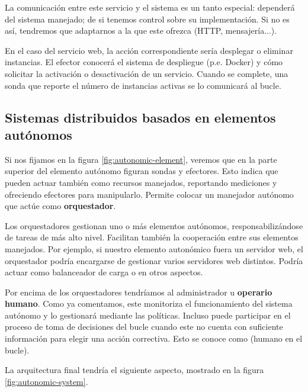 La comunicación entre este servicio y el sistema es un tanto especial: dependerá del sistema manejado; de si tenemos control sobre su implementación. Si no es así, tendremos que adaptarnos a la que este ofrezca (HTTP, mensajería...).

En el caso del servicio web, la acción correspondiente sería desplegar o eliminar instancias. El efector conocerá el sistema de despliegue (p.e. Docker) y cómo solicitar la activación o desactivación de un servicio. Cuando se complete, una sonda que reporte el número de instancias activas se lo comunicará al bucle.

\subsection{Sistemas distribuidos basados en elementos autónomos}

Si nos fijamos en la figura \ref{fig:autonomic-element}, veremos que en la parte superior del elemento autónomo figuran sondas y efectores. Esto indica que pueden actuar también como recursos manejados, reportando mediciones y ofreciendo efectores para manipularlo. Permite colocar un manejador autónomo que actúe como \textbf{orquestador}. \cite{ibmcorporationArchitecturalBlueprintAutonomic2006}

Los orquestadores gestionan uno o más elementos autónomos, responsabilizándose de tareas de más alto nivel. Facilitan también la cooperación entre sus elementos manejados. Por ejemplo, si nuestro elemento autonómico fuera un servidor web, el orquestador podría encargarse de gestionar varios servidores web distintos. Podría actuar como balanceador de carga o en otros aspectos.

Por encima de los orquestadores tendríamos al administrador u \textbf{operario humano}. Como ya comentamos, este monitoriza el funcionamiento del sistema autónomo y lo gestionará mediante las políticas. Incluso puede participar en el proceso de toma de decisiones del bucle cuando este no cuenta con suficiente información para elegir una acción correctiva. Esto se conoce como \textbf{} (humano en el bucle). \cite{gilDesigningHumanLoop2016a}

\pagebreak

La arquitectura final tendría el siguiente aspecto, mostrado en la figura \ref{fig:autonomic-system}.

